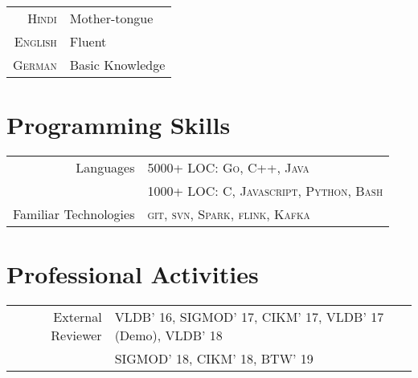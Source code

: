 \documentclass[a4paper,10pt]{article} %
\begin{document}
\begin{tabular}{rl}
\textsc{Hindi} & Mother-tongue\\
\textsc{English} & Fluent\\
\textsc{German} & Basic Knowledge\\
\end{tabular}


\section{Programming Skills}

\begin{tabular}{rl}
Languages & 5000+ LOC: \textsc{Go}, \textsc{C++}, \textsc{Java}\\
		  & 1000+ LOC: \textsc{C}, \textsc{Javascript}, \textsc{Python}, \textsc{Bash}\\
		  
Familiar Technologies & \textsc{git},  \textsc{svn},  \textsc{Spark},  \textsc{flink},  \textsc{Kafka} 
\end{tabular}

\section{Professional Activities}
\begin{tabular}{rl}
External Reviewer & VLDB' 16, SIGMOD' 17, CIKM' 17, VLDB' 17 (Demo), VLDB' 18\\
& SIGMOD' 18, CIKM' 18, BTW' 19
\end{tabular}

\end{document}
